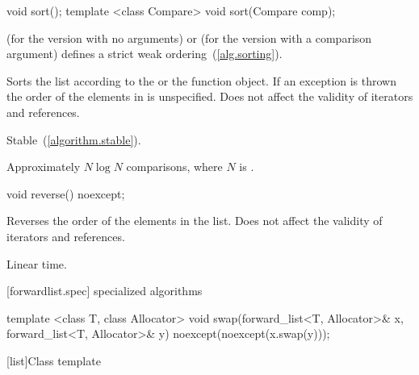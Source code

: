 %
%
\begin{itemdecl}
void sort();
template <class Compare> void sort(Compare comp);
\end{itemdecl}

\begin{itemdescr}
\pnum
\requires {} (for the version with no arguments) or  (for the
version with a comparison argument) defines a strict weak ordering~(\ref{alg.sorting}).

\pnum
\effects Sorts the list according to the  or the  function object.
If an exception is thrown the order of the elements in  is unspecified.
Does not affect the validity of iterators and references.

\pnum
\remarks Stable~(\ref{algorithm.stable}).

\pnum
\complexity Approximately $N \log N$ comparisons, where $N$ is .
\end{itemdescr}

%
%
\begin{itemdecl}
void reverse() noexcept;
\end{itemdecl}

\begin{itemdescr}
\pnum
\effects Reverses the order of the elements in the list.
Does not affect the validity of iterators and references.

\pnum
\complexity Linear time.
\end{itemdescr}

[forwardlist.spec]{ specialized algorithms}

%
%
\begin{itemdecl}
template <class T, class Allocator>
  void swap(forward_list<T, Allocator>& x, forward_list<T, Allocator>& y)
    noexcept(noexcept(x.swap(y)));
\end{itemdecl}

\begin{itemdescr}
\pnum
\effects {}
\end{itemdescr}

[list]{Class template }

